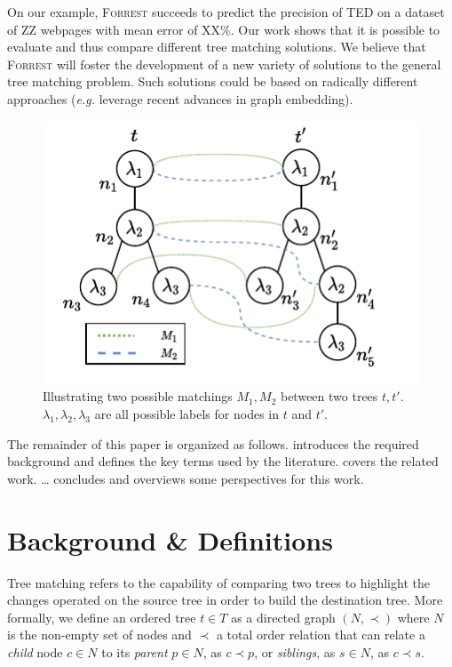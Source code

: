 \documentclass{vldb}
\newcommand{\forrest}[0]{\textsc{Forrest}\xspace}
\begin{document}
On our example, \forrest succeeds to predict the precision of TED on a dataset of ZZ webpages with mean error of XX\%.
Our work shows that it is possible to evaluate and thus compare different tree matching solutions.
We believe that \forrest will foster the development of a new variety of solutions to the general tree matching problem.
Such solutions could be based on radically different approaches (\emph{e.g.} leverage recent advances in graph embedding).


\begin{figure}
    \centering
	\includegraphics[width=.8\linewidth]{explanation/example_matchings}
    \caption{Illustrating two possible matchings $M_1, M_2$  between two trees $t, t'$. $\lambda_1, \lambda_2, \lambda_3$ are all possible labels for nodes in $t$ and $t'$.}
    \label{fig:tree_matching_example}
\end{figure}

The remainder of this paper is organized as follows.
 introduces the required background and defines the key terms used by the literature.
 covers the related work.
\dots
{} concludes and overviews some perspectives for this work.



\section{Background \& Definitions}\label{sec:background}
Tree matching refers to the capability of comparing two trees to highlight the changes operated on the source tree in order to build the destination tree.
More formally, we define an ordered tree $t \in T$ as a directed graph $(N,\prec)$ where $N$ is the non-empty set of nodes and $\prec$ a total order relation that can relate a \emph{child} node $c \in N$ to its \emph{parent} $p \in N$, as $c \prec p$, or \emph{siblings}, as $s \in N$, as $c \prec s$.
\end{document}
